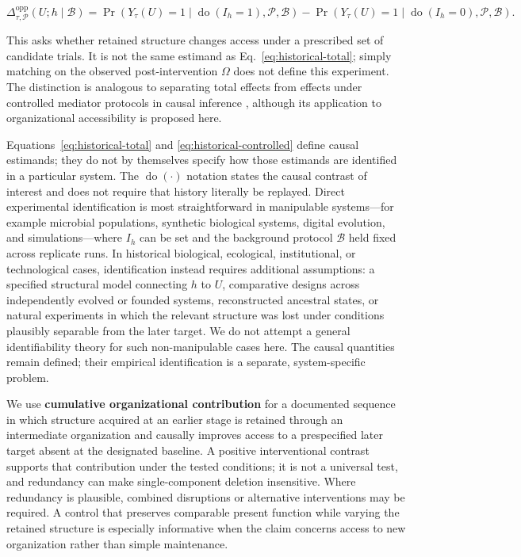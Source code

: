 \documentclass[11pt,a4paper]{article}
\begin{document}
\begin{equation}
\Delta_{\tau,\mathcal P}^{\mathrm{opp}}(U;h\mid\mathcal B)
=
\Pr\!\left(Y_\tau(U)=1\mid\operatorname{do}(I_h=1),\mathcal P,\mathcal B\right)
-
\Pr\!\left(Y_\tau(U)=1\mid\operatorname{do}(I_h=0),\mathcal P,\mathcal B\right).
\label{eq:historical-controlled}
\end{equation}

This asks whether retained structure changes access under a prescribed set of candidate trials. It is not the same estimand as Eq.~\eqref{eq:historical-total}; simply matching on the observed post-intervention $\Omega$ does not define this experiment. The distinction is analogous to separating total effects from effects under controlled mediator protocols in causal inference \citep{VanderWeele2014}, although its application to organizational accessibility is proposed here.

Equations~\eqref{eq:historical-total} and \eqref{eq:historical-controlled} define causal estimands; they do not by themselves specify how those estimands are identified in a particular system. The $\operatorname{do}(\cdot)$ notation states the causal contrast of interest and does not require that history literally be replayed. Direct experimental identification is most straightforward in manipulable systems---for example microbial populations, synthetic biological systems, digital evolution, and simulations---where $I_h$ can be set and the background protocol $\mathcal B$ held fixed across replicate runs. In historical biological, ecological, institutional, or technological cases, identification instead requires additional assumptions: a specified structural model connecting $h$ to $U$, comparative designs across independently evolved or founded systems, reconstructed ancestral states, or natural experiments in which the relevant structure was lost under conditions plausibly separable from the later target. We do not attempt a general identifiability theory for such non-manipulable cases here. The causal quantities remain defined; their empirical identification is a separate, system-specific problem.

We use \textbf{cumulative organizational contribution} for a documented sequence in which structure acquired at an earlier stage is retained through an intermediate organization and causally improves access to a prespecified later target absent at the designated baseline. A positive interventional contrast supports that contribution under the tested conditions; it is not a universal test, and redundancy can make single-component deletion insensitive. Where redundancy is plausible, combined disruptions or alternative interventions may be required. A control that preserves comparable present function while varying the retained structure is especially informative when the claim concerns access to new organization rather than simple maintenance.
\end{document}
